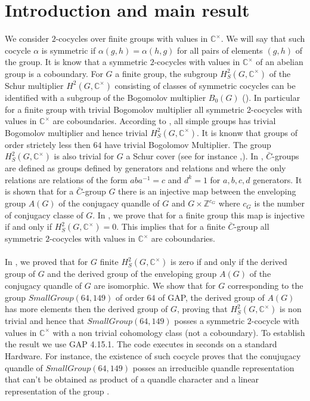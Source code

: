 \documentclass[12pt, reqno]{amsart}
\begin{document}
\section{Introduction and main result}
We consider $2$-cocycles over finite groups with values in $\mathbb{C}^\times$. We will say that such cocycle $\alpha$ is symmetric if $\alpha(g,h)=\alpha(h,g)$ for all pairs of elements $(g,h)$ of the group. It is know that a symmetric $2$-cocycles with values in $\mathbb{C}^\times$ of an abelian group is a coboundary. For $G$ a finite group, the subgroup $H_S^2(G,\mathbb{C}^\times)$ of the Schur multiplier $H^2(G,\mathbb{C}^\times)$ consisting of classes of symmetric cocycles can be identified with a subgroup of the Bogomolov multiplier $B_0(G)$ (\cite{Cq}). In particular for a finite group with trivial Bogomolov multiplier all symmetric 2-cocycles with values in $\mathbb{C}^\times$ are coboundaries. According to \cite{Bog}, all simple groups has trivial Bogomolov multiplier and hence trivial $H_S^2(G,\mathbb{C}^\times)$. It is knonw that groups of order strictely less then $64$ have trivial Bogolomov Multiplier. The group $H_S^2(G,\mathbb{C}^\times)$ is also trivial for $G$ a Schur cover (see for instance \cite{Qrep},\cite{Cq}). In \cite{leb}, $\bar{C}$-groups are defined as groups defined by generators and relations and where the only relations are relations of the form $aba^{-1}=c$ and $d^k=1$ for $a,b,c,d$ generators. It is shown that for a $\bar{C}$-group $G$ there is an injective map between the enveloping group $A(G)$ of the conjugacy quandle of $G$ and $G\times \mathbb{Z}^{c_G}$ where $c_G$ is the number of conjugacy classe of $G$. In \cite{Cq}, we prove that for a finite group this map is injective if and only if $H_S^2(G,\mathbb{C}^\times)=0$. This implies that for a finite $\bar{C}$-group all symmetric $2$-cocycles with values in $\mathbb{C}^\times$ are coboundaries.\\\\
In \cite{Cq}, we proved that for $G$ finite $H_S^2(G,\mathbb{C}^\times)$ is zero if and only if the derived group of $G$ and the derived group of the enveloping group $A(G)$ of the conjugacy quandle of $G$ are isomorphic. We show that for $G$ corresponding to the group $SmallGroup(64,149)$ of order $64$ of GAP, the derived group of $A(G)$ has more elements then the derived group of $G$, proving that $H^2_S(G,\mathbb{C}^\times)$ is non trivial and hence that $SmallGroup(64,149)$ posses a symmetric $2$-cocycle with values in $\mathbb{C}^\times$ with a non trivial cohomology class (not a coboundary). To establish the result we use GAP 4.15.1. The code executes in seconds on a standard Hardware. For instance, the existence of such cocycle proves that the conujugacy quandle of $SmallGroup(64,149)$ posses an irreducible quandle representation that can't be obtained as product of a quandle character and a linear representation of the group \cite{Cq}. 
\end{document}
